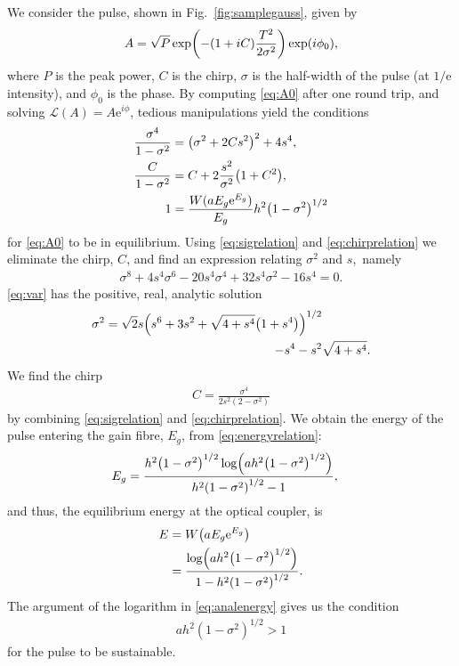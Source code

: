 \documentclass[9pt,twocolumn,twoside]{osajnl}
\let\originalleft\left
\let\originalright\right
\renewcommand{\left}{\mathopen{}\mathclose\bgroup\originalleft}
\renewcommand{\right}{\aftergroup\egroup\originalright}
\begin{document}
We consider the pulse, shown in Fig.~\ref{fig:samplegauss}, given by
\begin{align}
	A = \sqrt{P} \exp \left( -(1 + iC) \frac{T^2}{2 \sigma^2} \right) \exp(i \phi_0),
	\label{eq:A0}
\end{align}
where $P$ is the peak power, $C$ is the chirp, $\sigma$ is the half-width of the pulse (at $1 / \textrm{e}$ intensity), and $\phi_0$ is the phase. By computing \eqref{eq:A0} after one round trip, and solving $\mathcal{L}(A) = A \textrm{e}^{i \phi}$, tedious manipulations yield the conditions
\begin{align}
	\frac{\sigma^4}{1 - \sigma^2} &= \left( \sigma^2 + 2 C s^2 \right)^2 + 4 s^4, \label{eq:sigrelation} \\
	\frac{C}{1 - \sigma^2} &= C + 2 \frac{s^2}{\sigma^2} \left( 1 + C^2 \right), \label{eq:chirprelation} \\
	1 &= \frac{W(a E_g \textrm{e}^{E_g})}{E_g} h^2 \left( 1 - \sigma^2 \right)^{1/2} \label{eq:energyrelation}
\end{align}
for \eqref{eq:A0} to be in equilibrium. Using \eqref{eq:sigrelation} and \eqref{eq:chirprelation} we eliminate the chirp, $C$, and find an expression relating $\sigma^2$ and $s$,~namely
\begin{align}
	\sigma^8 + 4 s^4 \sigma^6 - 20 s^4 \sigma^4 + 32 s^4 \sigma^2 - 16 s^4 = 0.
	\label{eq:var}
\end{align}
\eqref{eq:var} has the positive, real, analytic solution
\begin{equation}
	\begin{split}
		\sigma^2 = \sqrt{2} s \left( s^6 + 3s^2 + \sqrt{4 + s^4} \left( 1 + s^4 \right) \right)^{1/2} & \\
		- s^4 - s^2 & \sqrt{4 + s^4}.
		\label{eq:equilvar}
	\end{split}
\end{equation}
We find the chirp
\begin{align}
	C = \frac{\sigma^4}{2 s^2 (2 - \sigma^2)}
	\label{eq:chirp}
\end{align}
by combining \eqref{eq:sigrelation} and \eqref{eq:chirprelation}. We obtain the energy of the pulse entering the gain fibre, $E_g$, from \eqref{eq:energyrelation}:
\begin{align}
	E_g &= \frac{h^2 \left( 1 - \sigma^2 \right)^{1/2} \log \left( a h^2 \left( 1 - \sigma^2 \right)^{1/2} \right)}{h^2 \left( 1 - \sigma^2 \right)^{1/2} - 1},
\end{align}
and thus, the equilibrium energy at the optical coupler, is
\begin{align}
	E &= W \left( a E_g \textrm{e}^{E_g} \right) \\
	&= \frac{\log \left( a h^2 \left( 1 - \sigma^2 \right)^{1/2} \right)}{1 - h^2 \left( 1 - \sigma^2 \right)^{1/2}}.
	\label{eq:analenergy}
\end{align}
The argument of the logarithm in \eqref{eq:analenergy} gives us the condition
\begin{align}
	a h^2 (1 - \sigma^2)^{1/2} > 1
	\label{eq:energycond}
\end{align}
for the pulse to be sustainable.
\end{document}
